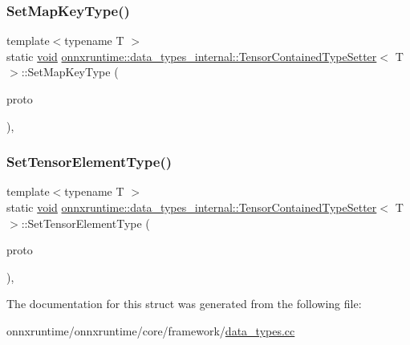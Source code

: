 \subsubsection{\texorpdfstring{Set\+Map\+Key\+Type()}{SetMapKeyType()}}
{\footnotesize\ttfamily template$<$typename T $>$ \\
static \mbox{\hyperlink{mlasi_8h_a88f941d423cb2a819b70a1358982b1a6}{void}} \mbox{\hyperlink{structonnxruntime_1_1data__types__internal_1_1TensorContainedTypeSetter}{onnxruntime\+::data\+\_\+types\+\_\+internal\+::\+Tensor\+Contained\+Type\+Setter}}$<$ T $>$\+::Set\+Map\+Key\+Type (\begin{DoxyParamCaption}\item[{O\+N\+N\+X\+\_\+\+N\+A\+M\+E\+S\+P\+A\+C\+E\+::\+Type\+Proto \&}]{proto }\end{DoxyParamCaption})\hspace{0.3cm}{\ttfamily [inline]}, {\ttfamily [static]}}

\mbox{\label{structonnxruntime_1_1data__types__internal_1_1TensorContainedTypeSetter_3_01T_01_4_a4e06eb31fc2421f7e6c66e0c758538c5}} 
\subsubsection{\texorpdfstring{Set\+Tensor\+Element\+Type()}{SetTensorElementType()}}
{\footnotesize\ttfamily template$<$typename T $>$ \\
static \mbox{\hyperlink{mlasi_8h_a88f941d423cb2a819b70a1358982b1a6}{void}} \mbox{\hyperlink{structonnxruntime_1_1data__types__internal_1_1TensorContainedTypeSetter}{onnxruntime\+::data\+\_\+types\+\_\+internal\+::\+Tensor\+Contained\+Type\+Setter}}$<$ T $>$\+::Set\+Tensor\+Element\+Type (\begin{DoxyParamCaption}\item[{O\+N\+N\+X\+\_\+\+N\+A\+M\+E\+S\+P\+A\+C\+E\+::\+Type\+Proto \&}]{proto }\end{DoxyParamCaption})\hspace{0.3cm}{\ttfamily [inline]}, {\ttfamily [static]}}



The documentation for this struct was generated from the following file\+:\begin{DoxyCompactItemize}
\item 
onnxruntime/onnxruntime/core/framework/\mbox{\hyperlink{data__types_8cc}{data\+\_\+types.\+cc}}\end{DoxyCompactItemize}
